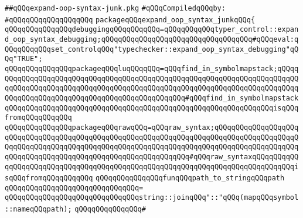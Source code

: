 \label{src/lib/compiler/front/typer/main/expand-oop-syntax-junk.pkg}
\verb|##qQQqexpand-oop-syntax-junk.pkg|\newline
\newline
\verb|#qQQqCompiledqQQqby:|\newline
\verb|#qQQqqQQqqQQqqQQqqQQq|\newline
\newline
\verb|packageqQQqexpand_oop_syntax_junkqQQq{|\newline
\newline
\verb|qQQqqQQqqQQqqQQqdebuggingqQQqqQQqqQQq=qQQqqQQqqQQqtyper_control::expand_oop_syntax_debugging;qQQqqQQqqQQqqQQqqQQqqQQqqQQqqQQqqQQq#qQQqeval:qQQqqQQqqQQqset_controlqQQq"typechecker::expand_oop_syntax_debugging"qQQq"TRUE";|\newline
\newline
\verb|qQQqqQQqqQQqqQQqpackageqQQqluqQQqqQQq=qQQqfind_in_symbolmapstack;qQQqqQQqqQQqqQQqqQQqqQQqqQQqqQQqqQQqqQQqqQQqqQQqqQQqqQQqqQQqqQQqqQQqqQQqqQQqqQQqqQQqqQQqqQQqqQQqqQQqqQQqqQQqqQQqqQQqqQQqqQQqqQQqqQQqqQQqqQQqqQQqqQQqqQQqqQQqqQQqqQQqqQQqqQQqqQQqqQQqqQQqqQQq#qQQqfind_in_symbolmapstackqQQqqQQqqQQqqQQqqQQqqQQqqQQqqQQqqQQqqQQqqQQqqQQqqQQqqQQqqQQqqQQqisqQQqfromqQQqqQQqqQQq|\newline
\verb|qQQqqQQqqQQqqQQqpackageqQQqrawqQQq=qQQqraw_syntax;qQQqqQQqqQQqqQQqqQQqqQQqqQQqqQQqqQQqqQQqqQQqqQQqqQQqqQQqqQQqqQQqqQQqqQQqqQQqqQQqqQQqqQQqqQQqqQQqqQQqqQQqqQQqqQQqqQQqqQQqqQQqqQQqqQQqqQQqqQQqqQQqqQQqqQQqqQQqqQQqqQQqqQQqqQQqqQQqqQQqqQQqqQQqqQQqqQQqqQQqqQQq#qQQqraw_syntaxqQQqqQQqqQQqqQQqqQQqqQQqqQQqqQQqqQQqqQQqqQQqqQQqqQQqqQQqqQQqqQQqqQQqqQQqqQQqqQQqisqQQqfromqQQqqQQqqQQq|\newline
\newline
\verb|qQQqqQQqqQQqqQQqfunqQQqpath_to_stringqQQqpath|\newline
\verb|qQQqqQQqqQQqqQQqqQQqqQQqqQQqqQQq=|\newline
\verb|qQQqqQQqqQQqqQQqqQQqqQQqqQQqqQQqstring::joinqQQq"::"qQQq(mapqQQqsymbol::nameqQQqpath);|\newline
\newline
\verb|qQQqqQQqqQQqqQQq#|\newline
